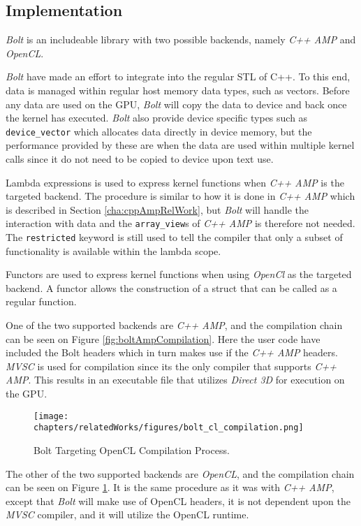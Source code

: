 \subsection{Implementation}
\textit{Bolt} is an includeable library with two possible backends, namely \textit{C++ AMP} and \textit{OpenCL}.  

\textit{Bolt} have made an effort to integrate into the regular STL of C++. To this end, data is managed within regular host memory data types, such as vectors. Before any data are used on the GPU, \textit{Bolt} will copy the data to device and back once the kernel has executed. \textit{Bolt} also provide device specific types such as \texttt{device\_vector} which allocates data directly in device memory, but the performance provided by these are when the data are used within multiple kernel calls since it do not need to be copied to device upon text use.

Lambda expressions is used to express kernel functions when \textit{C++ AMP} is the targeted backend. The procedure is similar to how it is done in \textit{C++ AMP} which is described in Section \ref{cha:cppAmpRelWork}, but \textit{Bolt} will handle the interaction with data and the \texttt{array\_view}s of \textit{C++ AMP} is therefore not needed. The \texttt{restricted} keyword is still used to tell the compiler that only a subset of functionality is available within the lambda scope.

Functors are used to express kernel functions when using \textit{OpenCl} as the targeted backend. A functor allows the construction of a struct that can be called as a regular function. 

One of the two supported backends are \textit{C++ AMP}, and the compilation chain can be seen on Figure \ref{fig:boltAmpCompilation}. Here the user code have included the Bolt headers which in turn makes use if the \textit{C++ AMP} headers. \textit{MVSC} is used for compilation since its the only compiler that supports \textit{C++ AMP}. This results in an executable file that utilizes \textit{Direct 3D} for execution on the GPU.

\begin{figure}[H]
\center
\texttt{[image: chapters/relatedWorks/figures/bolt\_cl\_compilation.png]}
\caption{Bolt Targeting OpenCL Compilation Process.}
\label{fig:boltClCompilation}
\end{figure}

The other of the two supported backends are \textit{OpenCL}, and the compilation chain can be seen on Figure \ref{fig:boltClCompilation}. It is the same procedure as it was with \textit{C++ AMP}, except that \textit{Bolt} will make use of OpenCL headers, it is not dependent upon the \textit{MVSC} compiler, and it will utilize the OpenCL runtime.


